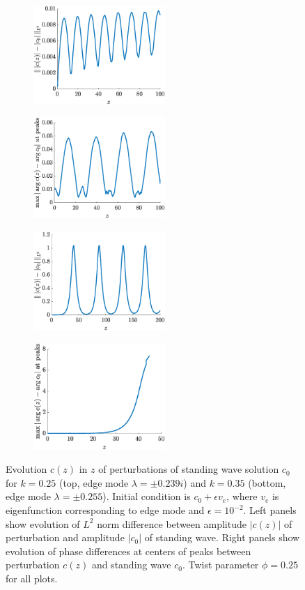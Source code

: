 \documentclass[11pt,reqno]{amsart}
\begin{document}
\begin{figure}
    \centering
    \begin{subfigure}{0.4\linewidth}
        \caption{}
        \label{fig:evolz1a}
        \includegraphics[width=5cm]{stableamp1.eps}
    \end{subfigure}
    \begin{subfigure}{0.4\linewidth}
        \caption{}
        \label{fig:evolz1b}
        \includegraphics[width=5cm]{stablephase1.eps}
    \end{subfigure}
        \begin{subfigure}{0.4\linewidth}
        \caption{}
        \label{fig:evolz1c}
        \includegraphics[width=5cm]{unstableamp1.eps}
    \end{subfigure}
    \begin{subfigure}{0.4\linewidth}
        \caption{}
        \label{fig:evolz1d}
        \includegraphics[width=5cm]{unstablephase1.eps}
    \end{subfigure}
    \caption{Evolution $c(z)$ in $z$ of perturbations of standing wave solution $c_0$ for $k = 0.25$ (top, edge mode $\lambda = \pm 0.239i$) and $k = 0.35$ (bottom, edge mode $\lambda = \pm 0.255$). Initial condition is $c_0 + \epsilon v_e$, where $v_e$ is eigenfunction corresponding to edge mode and $\epsilon = 10^{-2}$. Left panels show evolution of $L^2$ norm difference between amplitude $|c(z)|$ of perturbation and amplitude $|c_0|$ of standing wave. Right panels show evolution of phase differences at centers of peaks between perturbation $c(z)$ and standing wave $c_0$. Twist parameter $\phi = 0.25$ for all plots.}
    \label{fig:evolz1}
\end{figure}
\end{document}
